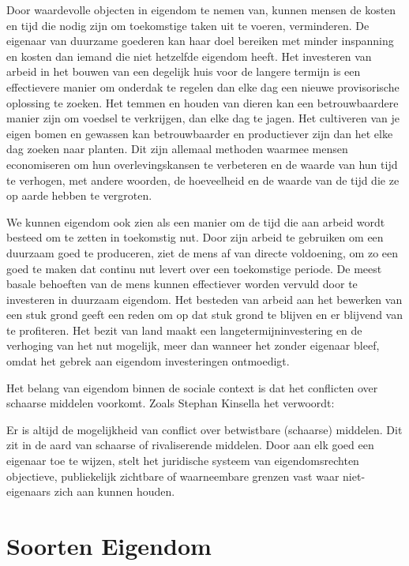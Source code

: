 Door waardevolle objecten in eigendom te nemen van, kunnen mensen de kosten en tijd die nodig zijn om toekomstige taken uit te voeren, verminderen. De eigenaar van duurzame goederen kan haar doel bereiken met minder inspanning en kosten dan iemand die niet hetzelfde eigendom heeft. Het investeren van arbeid in het bouwen van een degelijk huis voor de langere termijn is een effectievere manier om onderdak te regelen dan elke dag een nieuwe provisorische oplossing te zoeken. Het temmen en houden van dieren kan een betrouwbaardere manier zijn om voedsel te verkrijgen, dan elke dag te jagen. Het cultiveren van je eigen bomen en gewassen kan betrouwbaarder en productiever zijn dan het elke dag zoeken naar planten. Dit zijn allemaal methoden waarmee mensen economiseren om hun overlevingskansen te verbeteren en de waarde van hun tijd te verhogen, met andere woorden, de hoeveelheid en de waarde van de tijd die ze op aarde hebben te vergroten.

We kunnen eigendom ook zien als een manier om de tijd die aan arbeid wordt besteed om te zetten in toekomstig nut. Door zijn arbeid te gebruiken om een duurzaam goed te produceren, ziet de mens af van directe voldoening, om zo een goed te maken dat continu nut levert over een toekomstige periode. De meest basale behoeften van de mens kunnen effectiever worden vervuld door te investeren in duurzaam eigendom. Het besteden van arbeid aan het bewerken van een stuk grond geeft een reden om op dat stuk grond te blijven en er blijvend van te profiteren. Het bezit van land maakt een langetermijninvestering en de verhoging van het nut mogelijk, meer dan wanneer het zonder eigenaar bleef, omdat het gebrek aan eigendom investeringen ontmoedigt.

Het belang van eigendom binnen de sociale context is dat het conflicten over schaarse middelen voorkomt. Zoals Stephan Kinsella het verwoordt:

\begin{blockquotebox}
    Er is altijd de mogelijkheid van conflict over betwistbare (schaarse) middelen. Dit zit in de aard van schaarse of rivaliserende middelen. Door aan elk goed een eigenaar toe te wijzen, stelt het juridische systeem van eigendomsrechten objectieve, publiekelijk zichtbare of waarneembare grenzen vast waar niet-eigenaars zich aan kunnen houden.\footnotemark
\end{blockquotebox}


\section{Soorten Eigendom}

